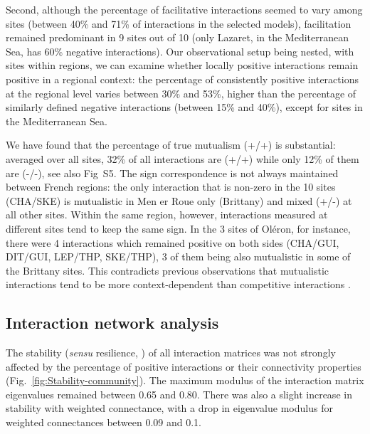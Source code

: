 \documentclass[10pt]{article}
\begin{document}
Second, although the percentage of facilitative interactions seemed
to vary among sites (between 40\% and 71\% of interactions in the
selected models), facilitation remained predominant in 9 sites out
of 10 (only Lazaret, in the Mediterranean Sea, has 60\% negative interactions).
Our observational setup being nested, with sites within regions, we
can examine whether locally positive interactions remain positive
in a regional context: the percentage of consistently positive interactions
at the regional level varies between 30\% and 53\%, higher than the
percentage of similarly defined negative interactions (between 15\%
and 40\%), except for sites in the Mediterranean Sea.

We have found that the percentage of true mutualism (+/+) is substantial:
averaged over all sites, 32\% of all interactions are (+/+) while
only 12\% of them are (-/-), see also Fig~S5. The sign
correspondence is not always maintained between French regions: the
only interaction that is non-zero in the 10 sites (CHA/SKE) is mutualistic
in Men er Roue only (Brittany) and mixed (+/-) at all other sites.
Within the same region, however, interactions measured at different
sites tend to keep the same sign. In the 3 sites of Oléron, for instance,
there were 4 interactions which remained positive on both sides (CHA/GUI,
DIT/GUI, LEP/THP, SKE/THP), 3 of them being also mutualistic in some
of the Brittany sites. This contradicts previous observations that
mutualistic interactions tend to be more context-dependent than competitive
interactions \citep{chamberlain_how_2014}. 


\subsection*{Interaction network analysis}

The stability (\emph{sensu} resilience, \citealt{ives_stability_2007})
of all interaction matrices was not strongly affected by the percentage
of positive interactions or their connectivity properties (Fig.~\ref{fig:Stability-community}).
The maximum modulus of the interaction matrix eigenvalues remained
between 0.65 and 0.80. There was also a slight increase in stability
with weighted connectance, with a drop in eigenvalue modulus for weighted
connectances between 0.09 and 0.1.
\end{document}
